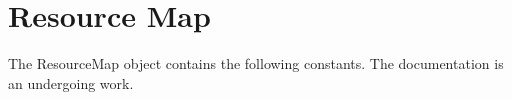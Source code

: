 

\newpage
{}
\section{Resource Map}


The ResourceMap object contains the following constants. The
documentation is an undergoing work.

